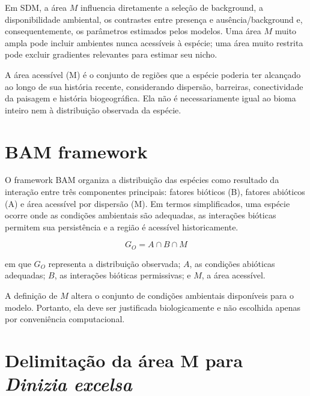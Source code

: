 \documentclass{ueap-sdm}
\begin{document}
Em SDM, a área \(M\) influencia diretamente a seleção de background, a disponibilidade ambiental, os contrastes entre presença e ausência/background e, consequentemente, os parâmetros estimados pelos modelos. Uma área \(M\) muito ampla pode incluir ambientes nunca acessíveis à espécie; uma área muito restrita pode excluir gradientes relevantes para estimar seu nicho.

\begin{conceito}[title={\faBook\quad Área acessível (M)}]
	A área acessível (M) é o conjunto de regiões que a espécie poderia ter alcançado ao longo de sua história recente, considerando dispersão, barreiras, conectividade da paisagem e história biogeográfica. Ela não é necessariamente igual ao bioma inteiro nem à distribuição observada da espécie.
\end{conceito}

\section{BAM framework}

O framework BAM organiza a distribuição das espécies como resultado da interação entre três componentes principais: fatores bióticos (B), fatores abióticos (A) e área acessível por dispersão (M). Em termos simplificados, uma espécie ocorre onde as condições ambientais são adequadas, as interações bióticas permitem sua persistência e a região é acessível historicamente.

\begin{equationbox}
	\[
	G_O = A \cap B \cap M
	\]
	
	em que \(G_O\) representa a distribuição observada; \(A\), as condições abióticas adequadas; \(B\), as interações bióticas permissivas; e \(M\), a área acessível.
\end{equationbox}

\begin{atencao}[title={\faExclamationTriangle\quad Área M não é detalhe técnico}]
	A definição de \(M\) altera o conjunto de condições ambientais disponíveis para o modelo. Portanto, ela deve ser justificada biologicamente e não escolhida apenas por conveniência computacional.
\end{atencao}

\section{Delimitação da área M para \textit{Dinizia excelsa}}
\end{document}
